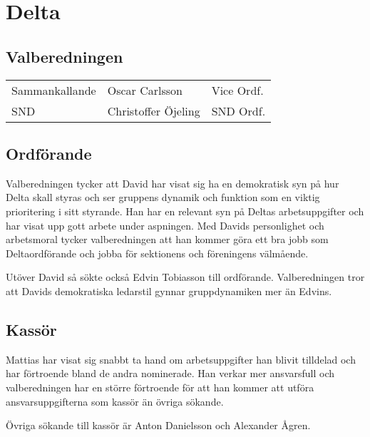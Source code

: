 \section{Delta}

\subsection{Valberedningen}
\begin{autoframe}
\begin{tabular}{lll}

Sammankallande & Oscar Carlsson & Vice Ordf. \\
SND & Christoffer Öjeling & SND Ordf. \\

\end{tabular}

\end{autoframe}

\subsection{Ordförande}
\begin{autoframe}

Valberedningen tycker att David har visat sig ha en demokratisk syn på hur Delta skall styras och ser gruppens dynamik och funktion som en viktig prioritering i sitt styrande. Han har en relevant syn på Deltas arbetsuppgifter och har visat upp gott arbete under aspningen. Med Davids personlighet och arbetsmoral tycker valberedningen att han kommer göra ett bra jobb som Deltaordförande och jobba för sektionens och föreningens välmående.
\bigskip

Utöver David så sökte också Edvin Tobiasson till ordförande. Valberedningen tror att Davids demokratiska ledarstil gynnar gruppdynamiken mer än Edvins.
\end{autoframe}

\subsection{Kassör}
\begin{autoframe}

Mattias har visat sig snabbt ta hand om arbetsuppgifter han blivit tilldelad och har förtroende bland de andra nominerade. Han verkar mer ansvarsfull och valberedningen har en större förtroende för att han kommer att utföra ansvarsuppgifterna som kassör än övriga sökande.

\bigskip
Övriga sökande till kassör är Anton Danielsson och Alexander Ågren.
\end{autoframe}

